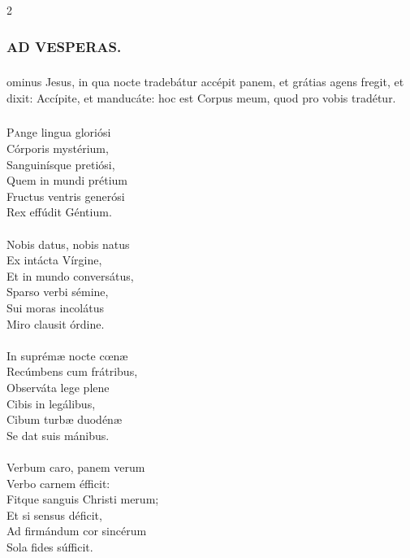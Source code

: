 \documentclass[9pt,twoside]{extarticle}
\begin{document}
\begin{multicols}{2}
\subsubsection*{\center \textsc{AD VESPERAS.}}
\subsubsection*{}
ominus Jesus, in qua nocte tradebátur accépit panem, et grátias agens fregit, et dixit: Accípite, et manducáte: hoc est Corpus meum, quod pro vobis tradétur.

\subsubsection*{\center{}}
\lettrine{P}ange lingua gloriósi\\ 
Córporis mystérium,\\ 
Sanguinísque pretiósi,\\ 
Quem in mundi prétium\\ 
Fructus ventris generósi\\ 
Rex effúdit Géntium.\\ 
\\
Nobis datus, nobis natus\\ 
Ex intácta Vírgine,\\ 
Et in mundo conversátus,\\ 
Sparso verbi sémine,\\ 
Sui moras incolátus\\ 
Miro clausit órdine.\\ 
\\
In suprémæ nocte cœnæ\\ 
Recúmbens cum frátribus,\\ 
Observáta lege plene\\ 
Cibis in legálibus,\\ 
Cibum turbæ duodénæ\\ 
Se dat suis mánibus.\\ 
\\
Verbum caro, panem verum\\ 
Verbo carnem éfficit:\\ 
Fitque sanguis Christi merum;\\ 
Et si sensus déficit,\\ 
Ad firmándum cor sincérum\\ 
Sola fides súfficit.\\ 

\end{multicols}
\end{document}

